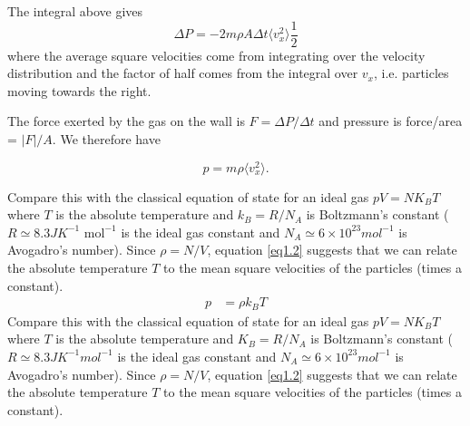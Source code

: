 The integral above gives 
$$\Delta P = -2m\rho A\Delta t \langle v_x^2\rangle\frac12$$ where the average square velocities come from integrating over the velocity distribution and the factor of half comes from the integral over $v_x$, i.e. particles moving towards the right.

The force exerted by the gas on the wall is $F=\Delta P/\Delta t$ and pressure is force/area = $|F|/A$.
We therefore have 

\begin{equation}
	p=m\rho  \langle v_x^2\rangle.
	\label{eq1.2}
\end{equation}
 
Compare this with the classical equation of state for an ideal gas $pV=NK_BT$ where $T$ is the absolute temperature and $k_B=R/N_A$ is Boltzmann's constant ($R\simeq8.3JK^{-1} \text{ mol}^{-1}$ is the ideal gas constant and $N_A\simeq6\times10^{23}mol^{-1}$ is Avogadro's number). Since $\rho = N/V$, equation \ref{eq1.2} suggests that we can relate the absolute temperature $T$ to the mean square velocities of the particles (times a constant).
\begin{align*}
	p &= \rho k_{B}T
\end{align*}
Compare this with the classical equation of state for an ideal gas $pV=NK_BT$ where $T$ is the absolute temperature and $K_B=R/N_A$ is Boltzmann's constant ($R\simeq8.3JK^{-1}mol^{-1}$ is the ideal gas constant and $N_A\simeq6\times10^{23}mol^{-1}$ is Avogadro's number). Since $\rho = N/V$, equation \ref{eq1.2} suggests that we can relate the absolute temperature $T$ to the mean square velocities of the particles (times a constant).


